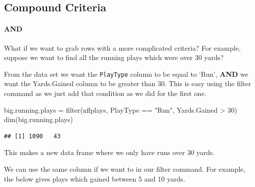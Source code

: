\documentclass[
]{book}
\newenvironment{Shaded}{\begin{snugshade}}{\end{snugshade}}
\newcommand{\DecValTok}[1]{\textcolor[rgb]{0.00,0.00,0.81}{#1}}
\newcommand{\DocumentationTok}[1]{\textcolor[rgb]{0.56,0.35,0.01}{\textbf{\textit{#1}}}}
\newcommand{\FunctionTok}[1]{\textcolor[rgb]{0.00,0.00,0.00}{#1}}
\newcommand{\NormalTok}[1]{#1}
\newcommand{\OtherTok}[1]{\textcolor[rgb]{0.56,0.35,0.01}{#1}}
\newcommand{\SpecialCharTok}[1]{\textcolor[rgb]{0.00,0.00,0.00}{#1}}
\newcommand{\StringTok}[1]{\textcolor[rgb]{0.31,0.60,0.02}{#1}}
\theoremstyle{definition}
\theoremstyle{definition}
\theoremstyle{definition}
\theoremstyle{definition}
\theoremstyle{remark}
\begin{document}
\hypertarget{compound-criteria}{%
\subsection{Compound Criteria}\label{compound-criteria}}

\hypertarget{and}{%
\paragraph{AND}\label{and}}

What if we want to grab rows with a more complicated criteria? For example, suppose we want to find all the running plays which were over 30 yards?

From the data set we want the \texttt{PlayType} column to be equal to `Run', \textbf{AND} we want the Yards.Gained column to be greater than 30. This is easy using the filter command as we just add that condition as we did for the first one.

\begin{Shaded}
\begin{Highlighting}[]
\NormalTok{big.running.plays }\OtherTok{=} \FunctionTok{filter}\NormalTok{(nflplays, PlayType }\SpecialCharTok{==} \StringTok{"Run"}\NormalTok{, Yards.Gained }\SpecialCharTok{\textgreater{}} \DecValTok{30}\NormalTok{)}
\FunctionTok{dim}\NormalTok{(big.running.plays)}
\end{Highlighting}
\end{Shaded}

\begin{verbatim}
## [1] 1090   43
\end{verbatim}

This makes a new data frame where we only have runs over 30 yards.

We can use the same column if we want to in our filter command. For example, the below gives plays which gained between 5 and 10 yards.

\begin{Shaded}
\end{Shaded}
\end{document}
